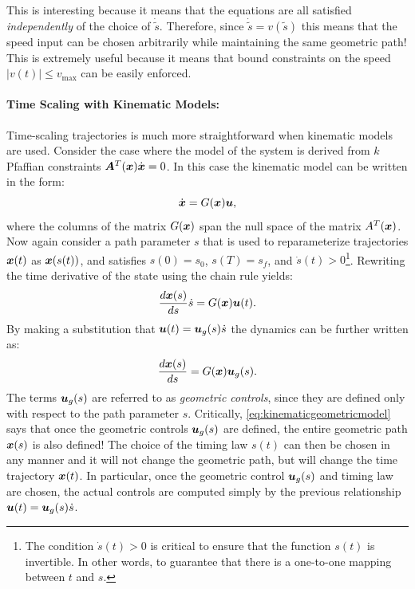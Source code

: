\begin{example}
This is interesting because it means that the equations are all satisfied \textit{independently} of the choice of $\dot{\tilde{s}}$. Therefore, since $\dot{\tilde{s}} = v(\tilde{s})$ this means that the speed input can be chosen arbitrarily while maintaining the same geometric path! This is extremely useful because it means that bound constraints on the speed $\lvert v(t)\rvert \leq v_\text{max}$ can be easily enforced.
\end{example}


\paragraph{Time Scaling with Kinematic Models:} Time-scaling trajectories is much more straightforward when kinematic models are used. Consider the case where the model of the system is derived from $k$ Pfaffian constraints $\bm{A}^T(\bm{x})\dot{\bm{x}} = 0$. In this case the kinematic model can be written in the form:
\begin{equation} \label{eq:kinmodel}
    \dot{\bm{x}} = G(\bm{x}) \bm{u},
\end{equation}
where the columns of the matrix $G(\bm{x})$ span the null space of the matrix $A^T(\bm{x})$. Now again consider a path parameter $s$ that is used to reparameterize trajectories $\bm{x}(t)$ as $\bm{x}(s(t))$, and satisfies $s(0) = s_0$, $s(T) = s_f$, and $\dot{s}(t) > 0$\footnote{The condition $\dot{s}(t) > 0$ is critical to ensure that the function $s(t)$ is invertible. In other words, to guarantee that there is a one-to-one mapping between $t$ and $s$.}. Rewriting the time derivative of the state using the chain rule yields:
\begin{equation}
    \frac{d\bm{x}(s)}{ds} \dot{s} = G(\bm{x}) \bm{u}(t).
\end{equation}
By making a substitution that $\bm{u}(t) =  \bm{u}_g(s)\dot{s}$ the dynamics can be further written as:
\begin{equation} \label{eq:kinematicgeometricmodel}
    \frac{d\bm{x}(s)}{ds} = G(\bm{x})\bm{u}_g(s).
\end{equation}
The terms $\bm{u}_g(s)$ are referred to as \textit{geometric controls}, since they are defined only with respect to the path parameter $s$. Critically, \eqref{eq:kinematicgeometricmodel} says that once the geometric controls $\bm{u}_g(s)$ are defined, the entire geometric path $\bm{x}(s)$ is also defined! The choice of the timing law $s(t)$ can then be chosen in any manner and it will not change the geometric path, but will change the time trajectory $\bm{x}(t)$. In particular, once the geometric control $\bm{u}_g(s)$ and timing law are chosen, the actual controls are computed simply by the previous relationship $\bm{u}(t) =  \bm{u}_g(s)\dot{s}$.

